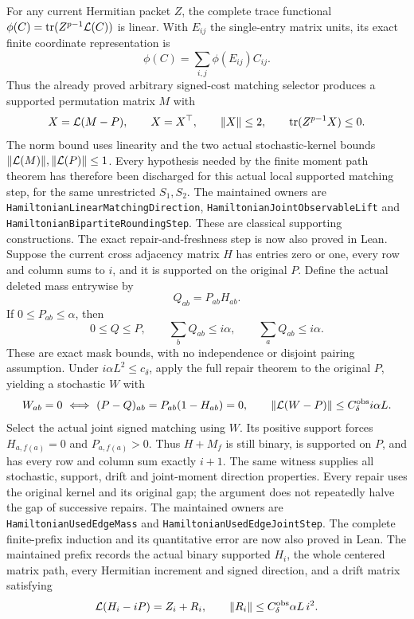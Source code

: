 For any current Hermitian packet \(Z\), the complete trace
functional
\(\phi(C)=\operatorname{tr}(Z^{p-1}{\cal L}(C))\)
is linear.
With \(E_{ij}\) the single-entry matrix units, its exact finite
coordinate representation is
\[
 \phi(C)=\sum_{i,j}\phi(E_{ij})C_{ij}.
\]
Thus the already proved arbitrary signed-cost matching selector
produces a supported permutation matrix \(M\) with
\[
 X={\cal L}(M-P),\qquad
 X=X^\top,\qquad \|X\|\leq2,\qquad
 \operatorname{tr}(Z^{p-1}X)\leq0.
\]
The norm bound uses linearity and the two actual stochastic-kernel
bounds \(\|{\cal L}(M)\|,\|{\cal L}(P)\|\leq1\).
Every hypothesis needed by the finite moment path theorem has
therefore been discharged for this actual local supported matching
step, for the same unrestricted \(S_1,S_2\).
The maintained owners are
\texttt{HamiltonianLinearMatchingDirection},
\texttt{HamiltonianJointObservableLift} and
\texttt{HamiltonianBipartiteRoundingStep}.
These are classical supporting constructions.
The exact repair-and-freshness step is now also proved in Lean.
Suppose the current cross adjacency matrix \(H\) has entries zero
or one, every row and column sums to \(i\), and it is supported
on the original \(P\).
Define the actual deleted mass entrywise by
\[
 Q_{ab}=P_{ab}H_{ab}.
\]
If \(0\leq P_{ab}\leq\alpha\), then
\[
 0\leq Q\leq P,\qquad
 \sum_b Q_{ab}\leq i\alpha,\qquad
 \sum_a Q_{ab}\leq i\alpha.
\]
These are exact mask bounds, with no independence or disjoint
pairing assumption.
Under \(i\alpha L^2\leq c_\delta\), apply the full repair theorem
to the original \(P\), yielding a stochastic \(W\) with
\[
 W_{ab}=0\ \Longleftrightarrow\
 (P-Q)_{ab}=P_{ab}(1-H_{ab})=0,\qquad
 \|{\cal L}(W-P)\|\leq C_\delta^{\rm obs}i\alpha L.
\]
Select the actual joint signed matching using \(W\).
Its positive support forces \(H_{a,f(a)}=0\) and
\(P_{a,f(a)}>0\).
Thus \(H+M_f\) is still binary, is supported on \(P\), and
has every row and column sum exactly \(i+1\).
The same witness supplies all stochastic, support, drift and
joint-moment direction properties.
Every repair uses the original kernel and its original gap;
the argument does not repeatedly halve the gap of successive repairs.
The maintained owners are \texttt{HamiltonianUsedEdgeMass} and
\texttt{HamiltonianUsedEdgeJointStep}.
The complete finite-prefix induction and its quantitative error are
now also proved in Lean.
The maintained prefix records the actual binary supported \(H_i\),
the whole centered matrix path, every Hermitian increment and signed
direction, and a drift matrix satisfying
\[
 {\cal L}(H_i-iP)=Z_i+R_i,\qquad
 \|R_i\|\leq C_\delta^{\rm obs}\alpha L\,i^2 .
\]
